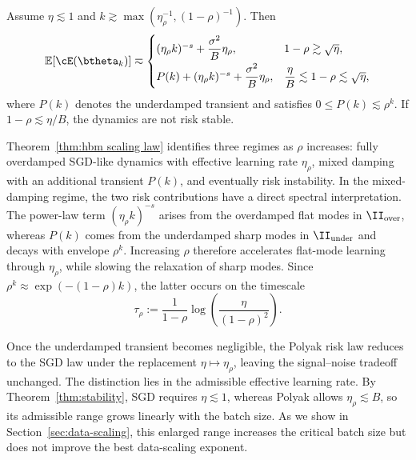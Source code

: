 \documentclass[11pt]{article}
\begin{document}
\begin{highlightedtheorem}
\begin{theorem}
\label{thm:hbm scaling law}
\normalfont
Assume \(\eta\lesssim1\) and \(k\gtrsim\max(\eta^{-1}_\rho,(1-\rho)^{-1})\). Then
\begin{equation}
\label{eq:hb-loss-scaling}
\mathbb E[\cE(\btheta_k)]\eqsim
\begin{cases}
(\eta_\rho k)^{-s}+\dfrac{\sigma^2}{B}\eta_\rho, & 1-\rho\gtrsim\sqrt{\eta},\\[2mm]
P(k)+(\eta_\rho k)^{-s}+\dfrac{\sigma^2}{B}\eta_\rho, & \dfrac{\eta}{B}\lesssim1-\rho\lesssim\sqrt{\eta},
\end{cases}
\end{equation}
where \(P(k)\) denotes the underdamped transient and satisfies \(0\leq P(k)\lesssim\rho^k\). If \(1-\rho\lesssim\eta/B\), the dynamics are not risk stable.
\end{theorem}
\end{highlightedtheorem}


Theorem~\ref{thm:hbm scaling law} identifies three regimes as \(\rho\) increases: fully overdamped SGD-like dynamics with effective learning rate \(\eta_\rho\), mixed damping with an additional transient \(P(k)\), and eventually risk instability.
In the mixed-damping regime, the two risk contributions have a direct spectral interpretation. The power-law term \((\eta_\rho k)^{-s}\) arises from the overdamped flat modes in \(\II_{\mathrm{over}}\), whereas \(P(k)\) comes from the underdamped sharp modes in \(\II_{\mathrm{under}}\) and decays with envelope \(\rho^k\). Increasing \(\rho\) therefore accelerates flat-mode learning through \(\eta_\rho\), while slowing the relaxation of sharp modes. Since \(\rho^k\approx\exp(-(1-\rho)k)\), the latter occurs on the timescale
\[
\tau_\rho:=\frac{1}{1-\rho}\log\left(\frac{\eta}{(1-\rho)^2}\right).
\]


Once the underdamped transient becomes negligible, the Polyak risk law reduces to the SGD law under the replacement \(\eta\mapsto\eta_\rho\), leaving the signal--noise tradeoff unchanged. The distinction lies in the admissible effective learning rate. By Theorem~\ref{thm:stability}, SGD requires \(\eta\lesssim1\), whereas Polyak allows \(\eta_\rho\lesssim B\), so its admissible range grows linearly with the batch size. As we show in Section~\ref{sec:data-scaling}, this enlarged range increases the critical batch size but does not improve the best data-scaling exponent.
\end{document}
